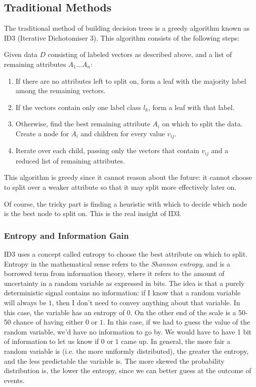 \documentclass[12pt, letterpaper]{article}
\begin{document}
\subsection{Traditional Methods}
The traditional method of building decision trees is a greedy algorithm known as ID3 (Iterative Dichotomiser 3)\cite{quinlan1986induction}. This algorithm consists of the following steps:

Given data $D$ consisting of labeled vectors as described above, and a list of remaining attributes $A_1\dots A_n$:

\begin{enumerate}
    \item If there are no attributes left to split on, form a leaf with the majority label among the remaining vectors.
    \item If the vectors contain only one label class $l_k$, form a leaf with that label.
    \item Otherwise, find the best remaining attribute $A_i$ on which to split the data. Create a node for $A_i$ and children for every value $v_{ij}$.
    \item Iterate over each child, passing only the vectors that contain $v_{ij}$ and a reduced list of remaining attributes.
\end{enumerate}

This algorithm is greedy since it cannot reason about the future: it cannot choose to split over a weaker attribute so that it may split more effectively later on.

Of course, the tricky part is finding a heuristic with which to decide which node is the best node to split on. This is the real insight of ID3.

\subsubsection*{Entropy and Information Gain}

ID3 uses a concept called entropy to choose the best attribute on which to split. Entropy in the mathematical sense refers to the \emph{Shannon entropy}, and is a borrowed term from information theory\cite{entropyWikipedia}, where it refers to the amount of uncertainty in a random variable as expressed in bits. The idea is that a purely deterministic signal contains no information: if I know that a random variable will always be $1$, then I don't need to convey anything about that variable. In this case, the variable has an entropy of $0$. On the other end of the scale is a 50-50 chance of having either $0$ or $1$. In this case, if we had to guess the value of the random variable, we'd have no information to go by. We would have to have 1 bit of information to let us know if $0$ or $1$ came up. In general, the more fair a random variable is (i.e. the more uniformly distributed), the greater the entropy, and the less predictable the variable is. The more skewed the probability distribution is, the lower the entropy, since we can better guess at the outcome of events. 
\end{document}
